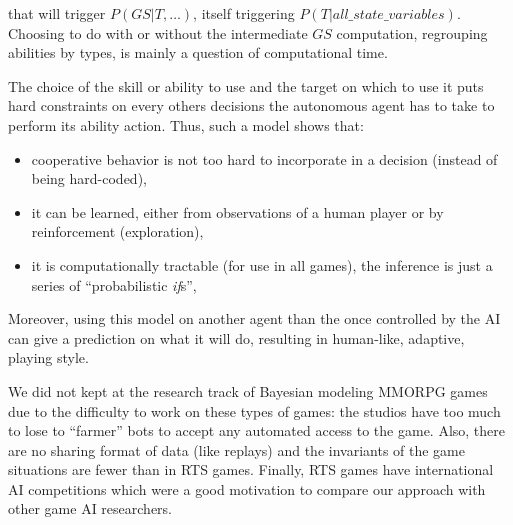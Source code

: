 that will trigger $P(GS|T,\dots)$, itself triggering $P(T|all\_state\_variables)$. Choosing to do with or without the intermediate $GS$ computation, regrouping abilities by types, is mainly a question of computational time.

The choice of the skill or ability to use and the target on which to use it puts hard constraints on every others decisions the autonomous agent has to take to perform its ability action. Thus, such a model shows that:
\begin{itemize}
    \item cooperative behavior is not too hard to incorporate in a decision (instead of being hard-coded),
    \item it can be learned, either from observations of a human player or by reinforcement (exploration),
    \item it is computationally tractable (for use in all games), the inference is just a series of ``probabilistic \textit{if}s'',
\end{itemize}
Moreover, using this model on another agent than the once controlled by the AI can give a prediction on what it will do, resulting in human-like, adaptive, playing style.

We did not kept at the research track of Bayesian modeling MMORPG games due to the difficulty to work on these types of games: the studios have too much to lose to ``farmer'' bots to accept any automated access to the game. Also, there are no sharing format of data (like replays) and the invariants of the game situations are fewer than in RTS games. Finally, RTS games have international AI competitions which were a good motivation to compare our approach with other game AI researchers.

